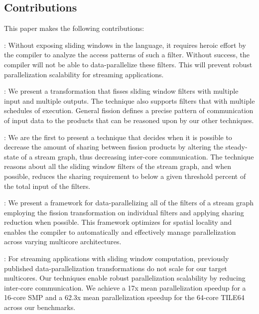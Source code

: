 \subsection{Contributions}
This paper makes the following contributions:
\begin{itemize}
  : Without exposing sliding windows in the language, it
  requires heroic effort by the compiler to analyze the access patterns
  of such a filter. Without success, the compiler will not be able to
  data-parallelize these filters.  This will prevent robust 
  parallelization scalability for streaming applications.

  : We present a
  transformation that fisses sliding window filters with multiple
  input and multiple outputs.  The technique also supports filters
  that with multiple schedules of execution.  General fission defines
  a precise pattern of communication of input data to the products
  that can be reasoned upon by our other techniques.

  : We are the first to present a technique
  that decides when it is possible to decrease the amount of sharing
  between fission products by altering the steady-state of a stream
  graph, thus decreasing inter-core communication.  The technique
  reasons about all the sliding window filters of the stream graph,
  and when possible, reduces the sharing requirement to below a given
  threshold percent of the total input of the filters. 

  : We present a
  framework for data-parallelizing all of the filters of a stream
  graph employing the fission transformation on individual filters and
  applying sharing reduction when possible.  This framework optimizes
  for spatial locality and enables the compiler to automatically and
  effectively manage parallelization across varying multicore
  architectures.

  : For
  streaming applications with sliding window computation, previously
  published data-parallelization transformations do not scale for our
  target multicores. Our techniques enable robust parallelization
  scalability by reducing inter-core communication.  We achieve a 17x
  mean parallelization speedup for a 16-core SMP and a 62.3x mean
  parallelization speedup for the 64-core TILE64 across our benchmarks.

\end{itemize}


